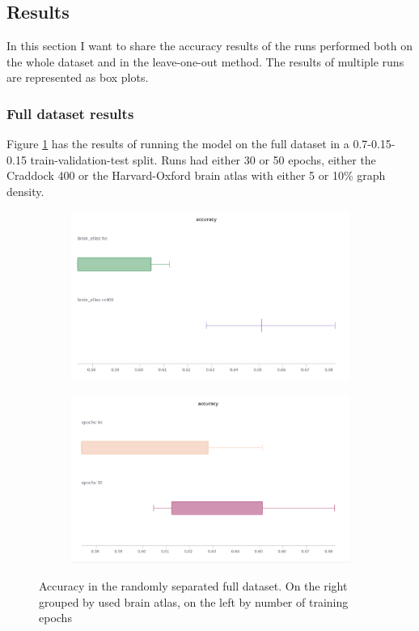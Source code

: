 	\subsection{Results}
	In this section I want to share the accuracy results of the runs performed both on the whole dataset and in the leave-one-out method. The results of multiple runs are represented as box plots.
	
	\subsubsection{Full dataset results}
	
	Figure \ref{fig:full_dataset} has the results of running the model on the full dataset in a 0.7-0.15-0.15 train-validation-test split. Runs had either 30 or 50 epochs, either the Craddock 400 or the Harvard-Oxford brain atlas with either 5 or 10\% graph density.
	
	\begin{figure}[!h]
		\centering
		\begin{subfigure}[b]{0.8\textwidth}
			\centering
			\includegraphics[width=\textwidth]{figures/all_atlas.png}
		\end{subfigure}
		\hfill
		\begin{subfigure}[b]{0.8\textwidth}
			\centering
			\includegraphics[width=\textwidth]{figures/all_epochs.png}
		\end{subfigure}
		\caption{Accuracy in the randomly separated full dataset. On the right grouped by used brain atlas, on the left by number of training epochs}
		\label{fig:full_dataset}
	\end{figure}
	

